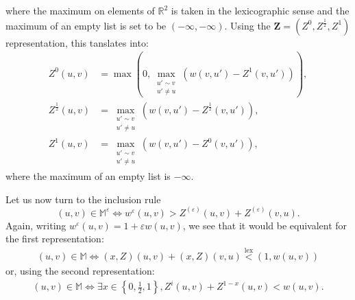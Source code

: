 \documentclass[11pt]{article}
\DeclareMathOperator{\lex}{lex}
\newcommand{\eps}{\varepsilon}
\begin{document}
where the maximum on elements of $\mathbb{R}^2$ is taken in the lexicographic sense and the maximum of an empty list is set to be $(-\infty,-\infty)$. Using the $\mathbf{Z}=(Z^0,Z^{\frac{1}{2}},Z^1)$ representation, this tanslates into:
\begin{equation}
\begin{aligned}\label{eq:systemrecursionZoomER}
    Z^0(u,v) &=  \max\left(0,\max_{\substack{ u' \sim v \\ u' \neq u}}\left( w(v,u')-Z^1(v,u') \right)\right) ,\\
    Z^{\frac{1}{2}}(u,v) &= \max_{\substack{ u' \sim v \\ u' \neq u}}\left( w(v,u')-Z^\frac{1}{2}(v,u') \right) ,\\
    Z^1(u,v) &= \max_{\substack{ u' \sim v \\ u' \neq u}}\left( w(v,u')-Z^0(v,u') \right), 
\end{aligned}
\end{equation}
where the maximum of an empty list is $-\infty$.

Let us now turn to the inclusion rule
\begin{equation*}
    (u,v) \in \mathbb{M}^\eps \Leftrightarrow w^\eps (u,v) > Z^{(\eps)}(u,v)+Z^{(\eps)}(v,u).
\end{equation*}
Again, writing $w^\eps(u,v)=1+\varepsilon w(u,v)$, we see that it would be equivalent for the first representation:
\begin{align*}
    (u,v) \in \mathbb{M} \Leftrightarrow (x,Z)(u,v)+(x,Z)(v,u) \overset{\mathrm{\lex}}{<} (1,w(u,v))
\end{align*}
or, using the second representation:
\begin{align}\label{eq:systeminclusionZoomER}
    (u,v) \in \mathbb{M} \Leftrightarrow \exists x \in \left\{0,\frac{1}{2},1\right\} , Z^{i}(u,v)+Z^{1-x}(u,v) < w(u,v).
\end{align}
\end{document}
